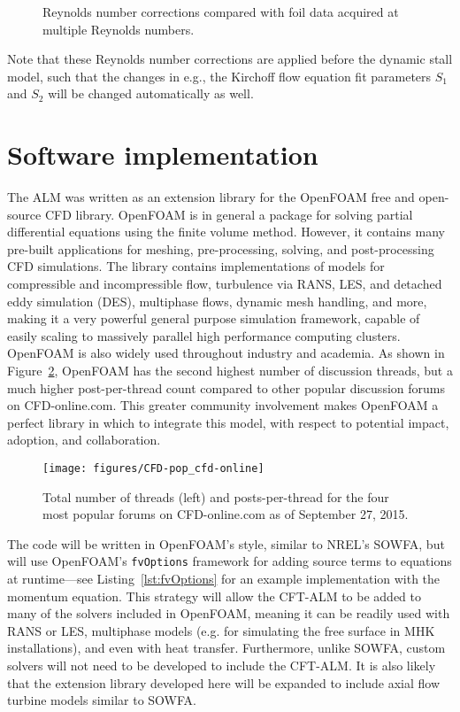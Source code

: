 \begin{figure}
    \caption{Reynolds number corrections compared with foil data acquired at
        multiple Reynolds numbers.}

    \label{fig:Re-corrections}
\end{figure}

Note that these Reynolds number corrections are applied before the dynamic stall
model, such that the changes in e.g., the Kirchoff flow equation fit parameters
$S_1$ and $S_2$ will be changed automatically as well.


\section{Software implementation}

The ALM was written as an extension library for the OpenFOAM free and
open-source CFD library. OpenFOAM is in general a package for solving partial
differential equations using the finite volume method. However, it contains many
pre-built applications for meshing, pre-processing, solving, and post-processing
CFD simulations. The library contains implementations of models for compressible
and incompressible flow, turbulence via RANS, LES, and detached eddy simulation
(DES), multiphase flows, dynamic mesh handling, and more, making it a very
powerful general purpose simulation framework, capable of easily scaling to
massively parallel high performance computing clusters. OpenFOAM is also widely
used throughout industry and academia. As shown in Figure~\ref{fig:cfd-online},
OpenFOAM has the second highest number of discussion threads, but a much higher
post-per-thread count compared to other popular discussion forums on
CFD-online.com. This greater community involvement makes OpenFOAM a perfect
library in which to integrate this model, with respect to potential impact,
adoption, and collaboration.

\begin{figure}[ht]
    \centering
    
    \texttt{[image: figures/CFD-pop\_cfd-online]}
    
    \caption{Total number of threads (left) and posts-per-thread for the four
        most popular forums on CFD-online.com as of September 27, 2015.}
    
    \label{fig:cfd-online}
\end{figure}

The code will be written in OpenFOAM's style, similar to NREL's SOWFA, but will
use OpenFOAM's \texttt{fvOptions} framework for adding source terms to equations
at runtime---see Listing~\ref{lst:fvOptions} for an example implementation with
the momentum equation. This strategy will allow the CFT-ALM to be added to many
of the solvers included in OpenFOAM, meaning it can be readily used with RANS or
LES, multiphase models (e.g. for simulating the free surface in MHK
installations), and even with heat transfer. Furthermore, unlike SOWFA, custom
solvers will not need to be developed to include the CFT-ALM. It is also likely
that the extension library developed here will be expanded to include axial flow
turbine models similar to SOWFA.

